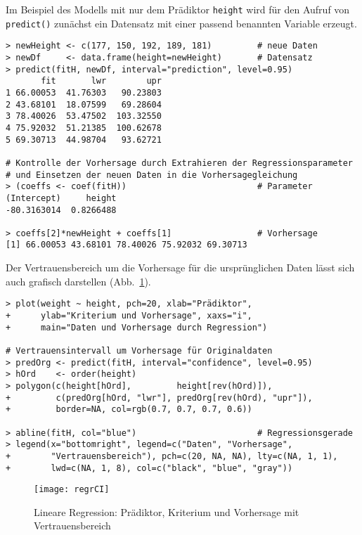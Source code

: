 Im Beispiel des Modells mit nur dem Prädiktor \lstinline!height! wird für den Aufruf von \lstinline!predict()! zunächst ein Datensatz mit einer passend benannten Variable erzeugt.
\begin{lstlisting}
> newHeight <- c(177, 150, 192, 189, 181)         # neue Daten
> newDf     <- data.frame(height=newHeight)       # Datensatz
> predict(fitH, newDf, interval="prediction", level=0.95)
       fit       lwr        upr
1 66.00053  41.76303   90.23803
2 43.68101  18.07599   69.28604
3 78.40026  53.47502  103.32550
4 75.92032  51.21385  100.62678
5 69.30713  44.98704   93.62721

# Kontrolle der Vorhersage durch Extrahieren der Regressionsparameter
# und Einsetzen der neuen Daten in die Vorhersagegleichung
> (coeffs <- coef(fitH))                          # Parameter
(Intercept)     height
-80.3163014  0.8266488

> coeffs[2]*newHeight + coeffs[1]                 # Vorhersage
[1] 66.00053 43.68101 78.40026 75.92032 69.30713
\end{lstlisting}

Der Vertrauensbereich um die Vorhersage für die ursprünglichen Daten lässt sich auch grafisch darstellen (Abb.\ \ref{fig:regrCI}).
\begin{lstlisting}
> plot(weight ~ height, pch=20, xlab="Prädiktor",
+      ylab="Kriterium und Vorhersage", xaxs="i",
+      main="Daten und Vorhersage durch Regression")

# Vertrauensintervall um Vorhersage für Originaldaten
> predOrg <- predict(fitH, interval="confidence", level=0.95)
> hOrd    <- order(height)
> polygon(c(height[hOrd],         height[rev(hOrd)]),
+         c(predOrg[hOrd, "lwr"], predOrg[rev(hOrd), "upr"]),
+         border=NA, col=rgb(0.7, 0.7, 0.7, 0.6))

> abline(fitH, col="blue")                        # Regressionsgerade
> legend(x="bottomright", legend=c("Daten", "Vorhersage",
+        "Vertrauensbereich"), pch=c(20, NA, NA), lty=c(NA, 1, 1),
+        lwd=c(NA, 1, 8), col=c("black", "blue", "gray"))
\end{lstlisting}

\begin{figure}[ht]
\centering
\texttt{[image: regrCI]}
\vspace*{-1em}
\caption{Lineare Regression: Prädiktor, Kriterium und Vorhersage mit Vertrauensbereich}
\label{fig:regrCI}
\end{figure}

